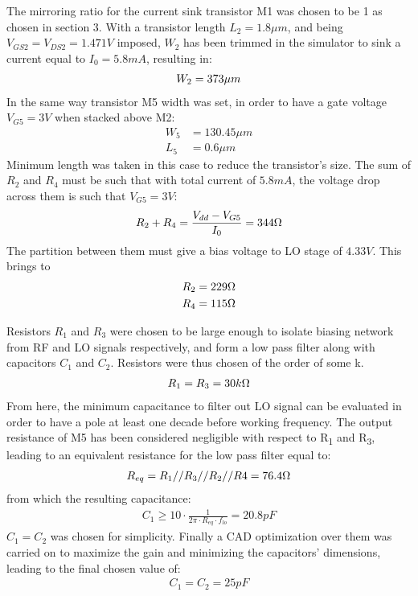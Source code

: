 The mirroring ratio for the current sink transistor M1 was chosen to be 1 as chosen in section 3. With a transistor length \(L_2 = 1.8\mu m\), and being \(V_{GS2}=V_{DS2}=1.471V\) imposed, \(W_2\) has been trimmed in the simulator to sink a current equal to \(I_0=5.8mA\), resulting in:
\begin{align}
W_2=373\mu m \notag
\end{align} 
In the same way transistor M5 width was set, in order to have a gate voltage \(V_{G5}=3V\) when stacked above M2:
\begin{align}
	W_5&=130.45\mu m \nonumber\\
	L_5&=0.6\mu m \nonumber
\end{align}
Minimum length was taken in this case to reduce the transistor's size.
The sum of \(R_2\) and \(R_4\) must be such that with total current of \(5.8mA\), the voltage drop across them is such that \(V_{G5}=3V\):
\begin{align}
	R_2+R_4=\frac{V_{dd}-V_{G5}}{I_0} = 344\ohm \nonumber
\end{align}
The partition between them must give a bias voltage to LO stage of \(4.33V\). This brings to
\begin{align}
	R_2=229\ohm\nonumber\\
	R_4=115\ohm\nonumber
\end{align}

Resistors \(R_1\) and \(R_3\) were chosen to be large enough to isolate biasing network from RF and LO signals respectively, and form a low pass filter along with capacitors \(C_1\) and \(C_2\). Resistors were thus chosen of the order of some k\ohm.
\begin{align}
	R_1=R_3=30k\ohm \nonumber
\end{align}
From here, the minimum capacitance to filter out LO signal can be evaluated in order to have a pole at least one decade before working frequency. The output resistance of M5 has been considered negligible with respect to R\textsubscript{1} and R\textsubscript{3}, leading to an equivalent resistance for the low pass filter equal to:
\begin{align}
	R_{eq}=R_1//R_3//R_2//R4=76.4 \ohm \nonumber
\end{align}
from which the resulting capacitance:
\begin{align}
	C_1\ge 10\cdot \frac{1}{2\pi \cdot R_{eq} \cdot f_{lo }} = 20.8pF
\end{align}
\(C_1 = C_2\) was chosen for simplicity. Finally a CAD optimization over them was carried on to maximize the gain and minimizing the capacitors' dimensions, leading to the final chosen value of:
\begin{align}
	C_1=C_2=25pF
\end{align}

